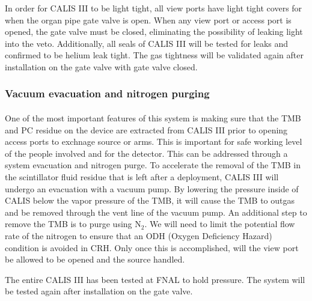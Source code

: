    In order for CALIS III to be light tight, all view ports have light tight covers for when the organ pipe gate valve is open. When any view port or access port is opened, the gate valve must be closed, eliminating the possibility of leaking light into the veto. Additionally, all seals of CALIS III will be tested for leaks and confirmed to be helium leak tight. The gas tightness will be validated again after installation on the gate valve with gate valve closed. 
	
 \subsubsection{Vacuum evacuation and nitrogen purging}
 \paragraph{}
   One of the most important features of this system is making sure that the TMB and PC residue on the device are extracted from CALIS III prior to opening access ports to exchnage source or arms. This is  important for  safe working level of the people involved and for the detector.  This can be addressed through a system evacuation and nitrogen purge.  To accelerate the removal of the TMB in the scintillator fluid residue that is left after a deployment, CALIS III will undergo an evacuation with a vacuum pump. By lowering the pressure inside of CALIS below the vapor pressure of the TMB, it will cause the TMB to outgas and be removed through the vent line of the vacuum pump. An additional step to remove the TMB is to purge using N$_{2}$.  We will need to limit the potential flow rate of the nitrogen to ensure that an ODH (Oxygen Deficiency Hazard) condition is avoided in CRH.  Only once this is accomplished, will the view port be allowed to be opened and the source handled.     
  
The entire CALIS III  has been tested at FNAL  to hold pressure.  The system will be tested again after installation on the gate valve.
 

